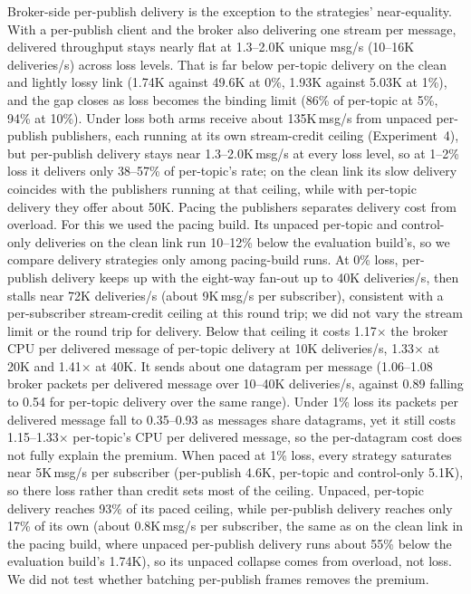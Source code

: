 \documentclass[a4paper,fleqn]{cas-dc}
\begin{document}
Broker-side per-publish delivery is the exception to the strategies' near-equality. With a per-publish client and the broker also delivering one stream per message, delivered throughput stays nearly flat at 1.3--2.0K unique msg/s (10--16K deliveries/s) across loss levels. That is far below per-topic delivery on the clean and lightly lossy link (1.74K against 49.6K at 0\%, 1.93K against 5.03K at 1\%), and the gap closes as loss becomes the binding limit (86\% of per-topic at 5\%, 94\% at 10\%). Under loss both arms receive about 135K\,msg/s from unpaced per-publish publishers, each running at its own stream-credit ceiling (Experiment~4), but per-publish delivery stays near 1.3--2.0K\,msg/s at every loss level, so at 1--2\% loss it delivers only 38--57\% of per-topic's rate; on the clean link its slow delivery coincides with the publishers running at that ceiling, while with per-topic delivery they offer about 50K. Pacing the publishers separates delivery cost from overload. For this we used the pacing build. Its unpaced per-topic and control-only deliveries on the clean link run 10--12\% below the evaluation build's, so we compare delivery strategies only among pacing-build runs. At 0\% loss, per-publish delivery keeps up with the eight-way fan-out up to 40K deliveries/s, then stalls near 72K deliveries/s (about 9K\,msg/s per subscriber), consistent with a per-subscriber stream-credit ceiling at this round trip; we did not vary the stream limit or the round trip for delivery. Below that ceiling it costs 1.17$\times$ the broker CPU per delivered message of per-topic delivery at 10K deliveries/s, 1.33$\times$ at 20K and 1.41$\times$ at 40K. It sends about one datagram per message (1.06--1.08 broker packets per delivered message over 10--40K deliveries/s, against 0.89 falling to 0.54 for per-topic delivery over the same range). Under 1\% loss its packets per delivered message fall to 0.35--0.93 as messages share datagrams, yet it still costs 1.15--1.33$\times$ per-topic's CPU per delivered message, so the per-datagram cost does not fully explain the premium. When paced at 1\% loss, every strategy saturates near 5K\,msg/s per subscriber (per-publish 4.6K, per-topic and control-only 5.1K), so there loss rather than credit sets most of the ceiling. Unpaced, per-topic delivery reaches 93\% of its paced ceiling, while per-publish delivery reaches only 17\% of its own (about 0.8K\,msg/s per subscriber, the same as on the clean link in the pacing build, where unpaced per-publish delivery runs about 55\% below the evaluation build's 1.74K), so its unpaced collapse comes from overload, not loss. We did not test whether batching per-publish frames removes the premium.
\end{document}
